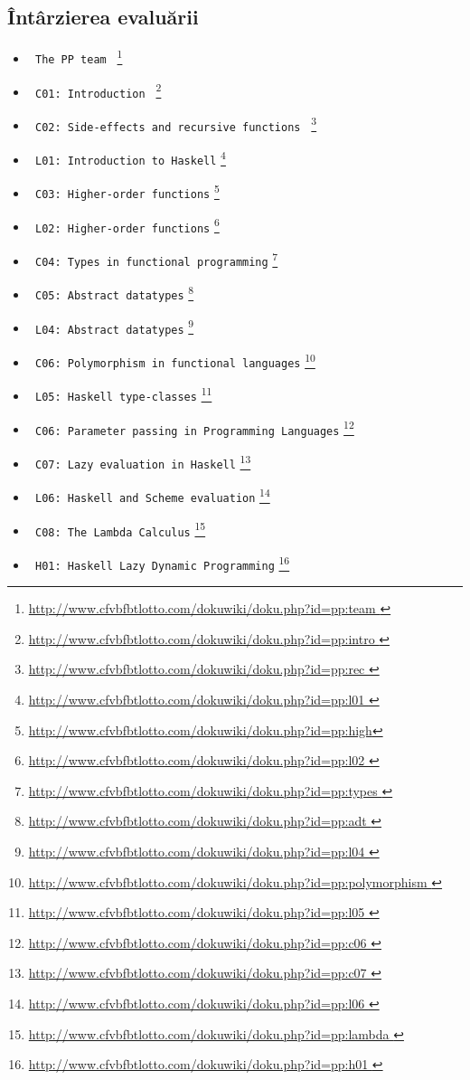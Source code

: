 \subsection*{ Întârzierea evaluării }
  \begin{itemize}
  	\item  \texttt{ The PP team } \footnote{\url{http://www.cfvbfbtlotto.com/dokuwiki/doku.php?id=pp:team }}
  	\item  \texttt{ C01: Introduction } \footnote{\url{http://www.cfvbfbtlotto.com/dokuwiki/doku.php?id=pp:intro }}
  	\item  \texttt{ C02: Side-effects and recursive functions } \footnote{\url{http://www.cfvbfbtlotto.com/dokuwiki/doku.php?id=pp:rec }}
  	\item  \texttt{ L01: Introduction to Haskell} \footnote{\url{http://www.cfvbfbtlotto.com/dokuwiki/doku.php?id=pp:l01 }}
  	\item  \texttt{ C03: Higher-order functions} \footnote{\url{http://www.cfvbfbtlotto.com/dokuwiki/doku.php?id=pp:high}}
  	\item  \texttt{ L02: Higher-order functions} \footnote{\url{http://www.cfvbfbtlotto.com/dokuwiki/doku.php?id=pp:l02 }} 
  	\item  \texttt{ C04: Types in functional programming} \footnote{\url{http://www.cfvbfbtlotto.com/dokuwiki/doku.php?id=pp:types }}
  	\item  \texttt{ C05: Abstract datatypes} \footnote{\url{http://www.cfvbfbtlotto.com/dokuwiki/doku.php?id=pp:adt }}
  	\item  \texttt{ L04: Abstract datatypes} \footnote{\url{http://www.cfvbfbtlotto.com/dokuwiki/doku.php?id=pp:l04 }}
  	\item  \texttt{ C06: Polymorphism in functional languages} \footnote{\url{http://www.cfvbfbtlotto.com/dokuwiki/doku.php?id=pp:polymorphism }}
  	\item  \texttt{ L05: Haskell type-classes} \footnote{\url{http://www.cfvbfbtlotto.com/dokuwiki/doku.php?id=pp:l05 }}
  	\item  \texttt{ C06: Parameter passing in Programming Languages} \footnote{\url{http://www.cfvbfbtlotto.com/dokuwiki/doku.php?id=pp:c06 }}
  	\item  \texttt{ C07: Lazy evaluation in Haskell} \footnote{\url{http://www.cfvbfbtlotto.com/dokuwiki/doku.php?id=pp:c07 }}
  	\item  \texttt{ L06: Haskell and Scheme evaluation} \footnote{\url{http://www.cfvbfbtlotto.com/dokuwiki/doku.php?id=pp:l06 }}
  	\item  \texttt{ C08: The Lambda Calculus} \footnote{\url{http://www.cfvbfbtlotto.com/dokuwiki/doku.php?id=pp:lambda }}
  	\item  \texttt{ H01: Haskell Lazy Dynamic Programming} \footnote{\url{http://www.cfvbfbtlotto.com/dokuwiki/doku.php?id=pp:h01 }}
  \end{itemize}



